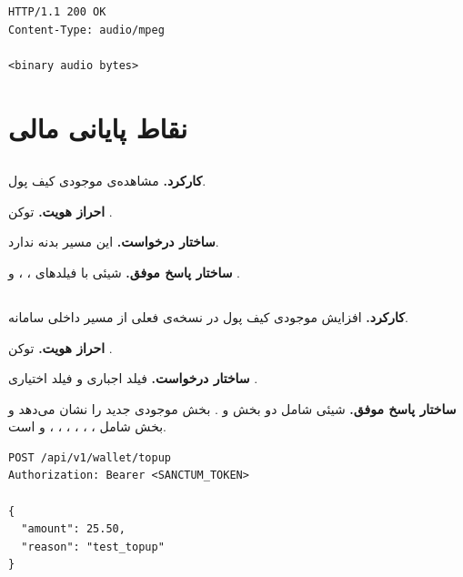 \begin{latin}
\begin{lstlisting}[style=jsonStyle]
HTTP/1.1 200 OK
Content-Type: audio/mpeg

<binary audio bytes>
\end{lstlisting}
\end{latin}


\section{نقاط پایانی مالی}

\subsection{}
\textbf{کارکرد.} مشاهده‌ی موجودی کیف پول.

\textbf{احراز هویت.} توکن .

\textbf{ساختار درخواست.} این مسیر بدنه ندارد.

\textbf{ساختار پاسخ موفق.} شیئی با فیلدهای ، ،
 و .

\subsection{}
\textbf{کارکرد.} افزایش موجودی کیف پول در نسخه‌ی فعلی از مسیر داخلی سامانه.

\textbf{احراز هویت.} توکن .

\textbf{ساختار درخواست.} فیلد اجباری  و فیلد اختیاری
.

\textbf{ساختار پاسخ موفق.} شیئی شامل دو بخش  و
. بخش  موجودی جدید را نشان می‌دهد و بخش
 شامل ، ، ، ،
، ،  و  است.

\begin{latin}
\begin{lstlisting}[style=jsonStyle]
POST /api/v1/wallet/topup
Authorization: Bearer <SANCTUM_TOKEN>

{
  "amount": 25.50,
  "reason": "test_topup"
}
\end{lstlisting}
\end{latin}


